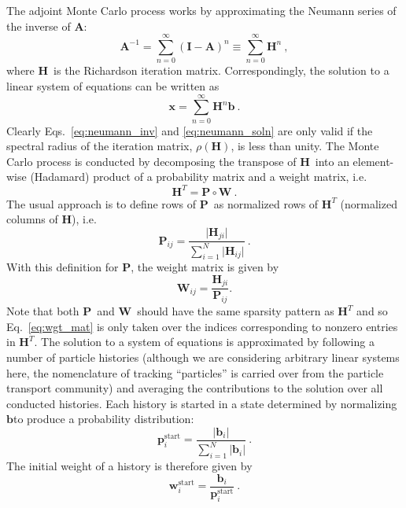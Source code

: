 \documentclass[10pt]{article}
\newcommand{\bx}{\ensuremath{\mathbf{x}}}
\newcommand{\bb}{\ensuremath{\mathbf{b}}}
\newcommand{\bp}{\ensuremath{\mathbf{p}}}
\newcommand{\bw}{\ensuremath{\mathbf{w}}}
\newcommand{\bA}{\ensuremath{\mathbf{A}}}
\newcommand{\bH}{\ensuremath{\mathbf{H}}}
\newcommand{\bP}{\ensuremath{\mathbf{P}}}
\newcommand{\bW}{\ensuremath{\mathbf{W}}}
\newcommand{\bI}{\ensuremath{\mathbf{I}}}
\begin{document}
The adjoint Monte Carlo process works by approximating the Neumann
series of the inverse of \bA:
\begin{equation}
\bA^{-1} = \sum_{n=0}^{\infty} ( \bI - \bA )^n
\equiv \sum_{n=0}^{\infty} \bH^n \:, \label{eq:neumann_inv}
\end{equation}
where \bH\ is the Richardson iteration matrix.
Correspondingly, the solution to a linear system of equations can
be written as
\begin{equation}
\bx = \sum_{n=0}^{\infty} \bH^n \bb \:. \label{eq:neumann_soln}
\end{equation}
Clearly
Eqs.~\eqref{eq:neumann_inv} and \eqref{eq:neumann_soln} are only
valid if the spectral radius of
the iteration matrix, $\rho(\bH)$, is less than unity.
The Monte Carlo process is conducted by decomposing the transpose of
\bH\ into an element-wise
(Hadamard) product of a probability matrix and a weight matrix, i.e.
\begin{equation}
\bH^T = \bP \circ \bW \:. \label{eq:mc_decomp}
\end{equation}
The usual approach is to define rows of \bP\ as normalized rows of $\bH^T$
(normalized columns of \bH), i.e.
\begin{equation}
\bP_{ij} =
\frac{\vert \bH_{ji} \vert}{\displaystyle \sum_{i=1}^{N} \vert \bH_{ij} \vert} \:.
\end{equation}
With this definition for \bP, the weight matrix is given by
\begin{equation}
\bW_{ij} = \frac{\bH_{ji}}{\bP_{ij}}. \label{eq:wgt_mat}
\end{equation}
Note that both \bP\ and \bW\ should have the same sparsity pattern
as $\bH^T$ and so Eq.~\eqref{eq:wgt_mat} is only taken over the indices corresponding
to nonzero entries in $\bH^T$.
The solution to a system of equations is approximated by following
a number of particle histories (although we are considering arbitrary
linear systems here, the nomenclature of tracking ``particles'' is
carried over from the particle transport community)
and averaging the contributions
to the solution over all conducted histories.  Each history is started
in a state determined by normalizing \bb to produce a probability
distribution:
\begin{equation}
\bp_i^\text{start} =
\frac{\vert \bb_i \vert}{\displaystyle \sum_{i=1}^{N} \vert \bb_i \vert} \:.
\end{equation}
The initial weight of a history is therefore given by
\begin{equation}
\bw_i^\text{start} = \frac{\bb_i}{\bp_i^\text{start}} \:.
\end{equation}
\end{document}

